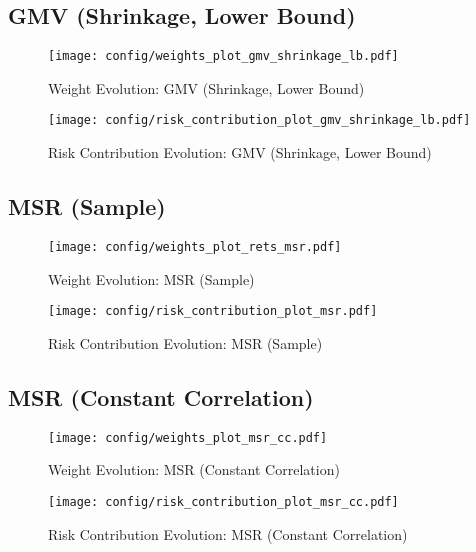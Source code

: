 \documentclass{article}
\begin{document}
\subsection{GMV (Shrinkage, Lower Bound)}
\begin{figure}[H]
    \centering
    \texttt{[image: config/weights\_plot\_gmv\_shrinkage\_lb.pdf]}
    \caption{Weight Evolution: GMV (Shrinkage, Lower Bound)}
    \label{fig:weights_gmv_shrinkage_lb}
\end{figure}
\begin{figure}[H]
    \centering
    \texttt{[image: config/risk\_contribution\_plot\_gmv\_shrinkage\_lb.pdf]}
    \caption{Risk Contribution Evolution: GMV (Shrinkage, Lower Bound)}
    \label{fig:risk_contribution_gmv_shrinkage_lb}
\end{figure}
\clearpage

\subsection{MSR (Sample)}
\begin{figure}[H]
    \centering
    \texttt{[image: config/weights\_plot\_rets\_msr.pdf]}
    \caption{Weight Evolution: MSR (Sample)}
    \label{fig:weights_msr_sample}
\end{figure}
\begin{figure}[H]
    \centering
    \texttt{[image: config/risk\_contribution\_plot\_msr.pdf]}
    \caption{Risk Contribution Evolution: MSR (Sample)}
    \label{fig:risk_contribution_msr_sample}
\end{figure}
\clearpage

\subsection{MSR (Constant Correlation)}
\begin{figure}[H]
    \centering
    \texttt{[image: config/weights\_plot\_msr\_cc.pdf]}
    \caption{Weight Evolution: MSR (Constant Correlation)}
    \label{fig:weights_msr_cc}
\end{figure}
\begin{figure}[H]
    \centering
    \texttt{[image: config/risk\_contribution\_plot\_msr\_cc.pdf]}
    \caption{Risk Contribution Evolution: MSR (Constant Correlation)}
    \label{fig:risk_contribution_msr_cc}
\end{figure}
\clearpage
\end{document}
